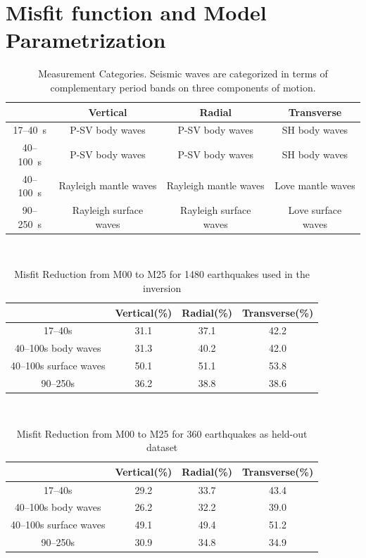 \documentclass[extra,mreferee]{gji}
\begin{document}
\section{Misfit function and Model Parametrization}

\begin{table}[!htb]
\caption{Measurement Categories. Seismic waves are categorized in terms of complementary period bands on three components of motion.}
\label{tab:category}
\begin{tabular}{|c|c|c|c|}
\hline
~          &  Vertical & Radial &  Transverse \\
\hline
17--40~s   &   P-SV body waves          & P-SV body waves           & SH body waves   \\
40--100~s  &   P-SV body waves          & P-SV body waves           & SH body waves \\
40--100~s  &   Rayleigh mantle waves    & Rayleigh mantle waves     & Love mantle waves \\
90--250~s  &   Rayleigh surface waves   & Rayleigh surface waves    & Love surface waves \\
\hline
\end{tabular}\\
\label{table:categories}
\end{table}

\begin{table}[!htb]
\caption{Misfit Reduction from M00 to M25 for 1480 earthquakes used in the inversion}
\label{tab:category}
\begin{tabular}{|c|c|c|c|}
\hline
~          &  Vertical(\%) & Radial(\%) &  Transverse(\%) \\
\hline
17--40s                &   31.1    &       37.1 &       42.2 \\
40--100s body waves    &    31.3   &       40.2 &       42.0 \\
40--100s surface waves &   50.1    &       51.1 &       53.8 \\
90--250s               &    36.2   &       38.8 &       38.6 \\
\hline
\end{tabular}\\
\label{table:categories}
\end{table}

\begin{table}[!htb]
\caption{Misfit Reduction from M00 to M25 for 360 earthquakes as held-out dataset}
\label{tab:category}
\begin{tabular}{|c|c|c|c|}
\hline
~          &  Vertical(\%) & Radial(\%) &  Transverse(\%) \\
\hline
17--40s                &         29.2 &       33.7 &       43.4 \\
40--100s body waves    &         26.2 &       32.2 &       39.0 \\
40--100s surface waves &         49.1 &       49.4 &       51.2 \\
90--250s               &         30.9 &       34.8 &       34.9 \\
\hline
\end{tabular}\\
\label{table:categories}
\end{table}
\end{document}
